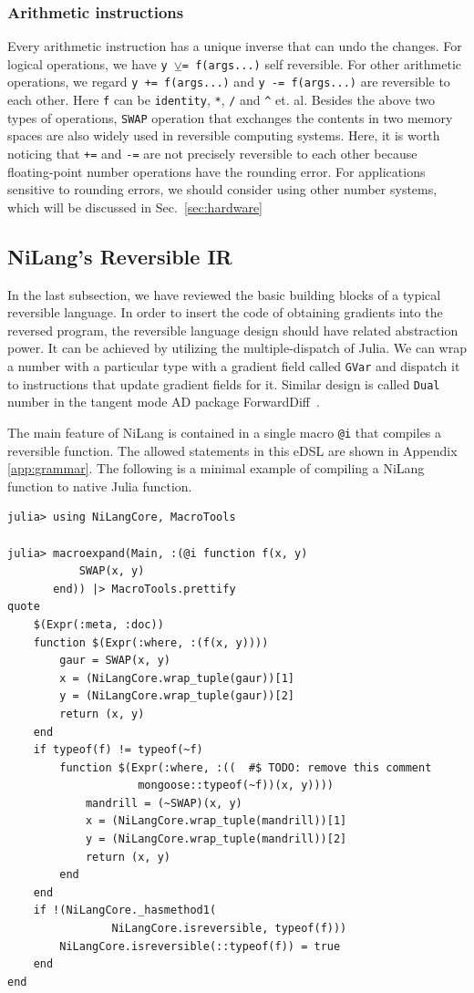 \documentclass[aps,twocolumn,longbibliography,english,superscriptaddress]{revtex4-1}
\newcommand{\<}{\langle}
\renewcommand{\>}{\rangle}
\newcommand{\Sec}[1]{Sec.~\ref{#1}}
\newcommand{\App}[1]{Appendix \ref{#1}}
\theoremstyle{definition}\newtheorem{definition}{\textit{Definition}}
\begin{document}
\subsubsection{Arithmetic instructions}
Every arithmetic instruction has a unique inverse that can undo the changes.
For logical operations, we have \texttt{y $\veebar$= f(args...)} self reversible.
For other arithmetic operations, we regard \texttt{y += f(args...)} and \texttt{y -= f(args...)} are reversible to each other. Here \texttt{f} can be \texttt{identity}, \texttt{*}, \texttt{/} and \texttt{\^} et. al.
Besides the above two types of operations, \texttt{SWAP} operation that exchanges the contents in two memory spaces are also widely used in reversible computing systems.
Here, it is worth noticing that \texttt{+=} and \texttt{-=} are not precisely reversible to each other because floating-point number operations have the rounding error. For applications sensitive to rounding errors, we should consider using other number systems, which will be discussed in \Sec{sec:hardware}

\subsection{NiLang's Reversible IR}
In the last subsection, we have reviewed the basic building blocks of a typical reversible language. In order to insert the code of obtaining gradients into the reversed program, the reversible language design should have related abstraction power.
It can be achieved by utilizing the multiple-dispatch of Julia.
We can wrap a number with a particular type with a gradient field called \texttt{GVar} and dispatch it to instructions that update gradient fields for it.
Similar design is called \texttt{Dual} number in the tangent mode AD package ForwardDiff~\cite{Revels2016}.

The main feature of NiLang is contained in a single macro \texttt{@i} that compiles a reversible function.
The allowed statements in this eDSL are shown in \App{app:grammar}.
The following is a minimal example of compiling a NiLang function to native Julia function.

\begin{minipage}{.44\textwidth}
\begin{lstlisting}
julia> using NiLangCore, MacroTools

julia> macroexpand(Main, :(@i function f(x, y)
           SWAP(x, y)
       end)) |> MacroTools.prettify
quote
    $(Expr(:meta, :doc))
    function $(Expr(:where, :(f(x, y))))
        gaur = SWAP(x, y)
        x = (NiLangCore.wrap_tuple(gaur))[1]
        y = (NiLangCore.wrap_tuple(gaur))[2]
        return (x, y)
    end
    if typeof(f) != typeof(~f)
        function $(Expr(:where, :((  #$ TODO: remove this comment
                    mongoose::typeof(~f))(x, y))))
            mandrill = (~SWAP)(x, y)
            x = (NiLangCore.wrap_tuple(mandrill))[1]
            y = (NiLangCore.wrap_tuple(mandrill))[2]
            return (x, y)
        end
    end
    if !(NiLangCore._hasmethod1(
                NiLangCore.isreversible, typeof(f)))
        NiLangCore.isreversible(::typeof(f)) = true
    end
end
\end{lstlisting}
\end{minipage}
\end{document}
